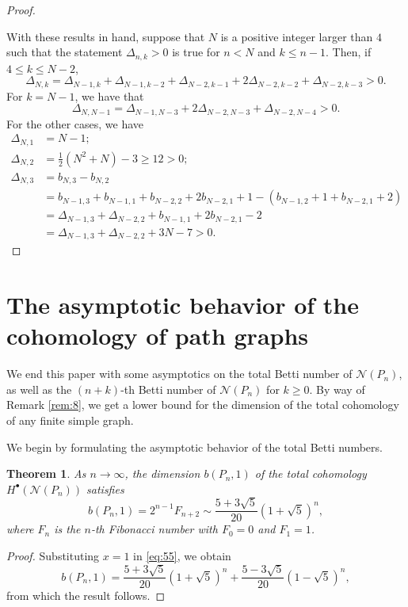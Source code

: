 \documentclass[12pt]{amsart}
\newtheorem{theorem}{Theorem}[section]
\theoremstyle{definition}
\begin{document}
\begin{proof}
\begin{enumerate}[(I)]
    \end{enumerate}
With these results in hand, suppose that $N$ is a positive integer larger than $4$ such that the statement $\Delta_{n,k} >0$ is true for $ n < N$ and $k \leq n-1$. Then, if $4 \leq k \leq N-2$, \[ \Delta_{N,k} = \Delta_{N-1,k} + \Delta_{N-1,k-2} + \Delta_{N-2,k-1} + 2\Delta_{N-2,k-2} + \Delta_{N-2,k-3} >0. \] For $k = N-1$, we have that \[\Delta_{N,N-1} = \Delta_{N-1,N-3} + 2 \Delta_{N-2,N-3} + \Delta_{N-2,N-4} > 0.\] For the other cases, we have 
\begin{align*}
\Delta_{N,1} &= N-1;\\
\Delta_{N,2} &= \frac{1}{2}(N^2 +N) -3 \geq 12 > 0;\\
\Delta_{N,3} &= b_{N,3} - b_{N,2} \\
& = b_{N-1,3} + b_{N-1,1} + b_{N-2,2} + 2b_{N-2,1} + 1 -(b_{N-1,2} + 1 + b_{N-2,1}+ 2)\\ 
&=\Delta_{N-1,3} +\Delta_{N-2,2} + b_{N-1,1} + 2b_{N-2,1} - 2 \\
&= \Delta_{N-1,3} + \Delta_{N-2,2} + 3N - 7 > 0. 
\end{align*}
\end{proof}

\section{The asymptotic behavior of the cohomology of path graphs}\label{sec:6}
We end this paper with some asymptotics on the total Betti number of $\mathcal N (P_n)$, as well as the $(n+k)$-th Betti number of $\mathcal N (P_n)$ for $k \geq 0$. By way of Remark \ref{rem:8}, we get a lower bound for the dimension of the total cohomology of any finite simple graph.

We begin by formulating the asymptotic behavior of the total Betti numbers.

\begin{theorem}\label{thm:38}
As $n\to \infty$, the dimension $b(P_n,1)$ of the total cohomology $H^\bullet(\mathcal N(P_n))$ satisfies
\[
b(P_n,1)=2^{n-1}F_{n+2}\sim \frac{5+3\sqrt{5}}{20}(1+\sqrt{5})^n,
\]
where $F_{n}$ is the $n$-th Fibonacci number with $F_0=0$ and $F_1=1$.
\end{theorem}

\begin{proof}
Substituting $x=1$ in \eqref{eq:55}, we obtain
\[
b(P_n,1) = \frac{5+3\sqrt{5}}{20}(1+\sqrt{5})^n + \frac{5-3\sqrt{5}}{20}(1-\sqrt{5})^n,
\]
from which the result follows.
\end{proof}
\end{document}
